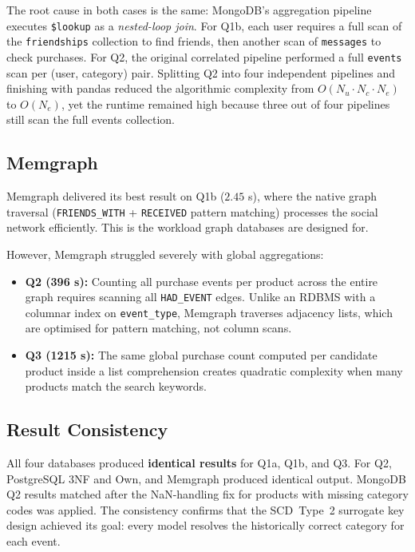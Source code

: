 \documentclass[12pt,a4paper]{article}
\begin{document}
The root cause in both cases is the same: MongoDB's aggregation pipeline
executes \texttt{\$lookup} as a \emph{nested-loop join}. For Q1b, each
user requires a full scan of the \texttt{friendships} collection to find
friends, then another scan of \texttt{messages} to check purchases. For Q2,
the original correlated pipeline performed a full \texttt{events} scan per
(user, category) pair. Splitting Q2 into four independent pipelines and
finishing with pandas reduced the algorithmic complexity from $O(N_u \cdot
N_c \cdot N_e)$ to $O(N_e)$, yet the runtime remained high because three
out of four pipelines still scan the full events collection.

\subsection{Memgraph}

Memgraph delivered its best result on Q1b ($2.45$ s), where the native graph
traversal (\texttt{FRIENDS\_WITH} + \texttt{RECEIVED} pattern matching)
processes the social network efficiently. This is the workload graph databases
are designed for.

However, Memgraph struggled severely with global aggregations:
\begin{itemize}
  \item \textbf{Q2 (396 s):} Counting all purchase events per product across
        the entire graph requires scanning all \texttt{HAD\_EVENT} edges.
        Unlike an RDBMS with a columnar index on \texttt{event\_type}, Memgraph
        traverses adjacency lists, which are optimised for pattern matching,
        not column scans.
  \item \textbf{Q3 (1215 s):} The same global purchase count computed per
        candidate product inside a list comprehension creates quadratic
        complexity when many products match the search keywords.
\end{itemize}

\subsection{Result Consistency}

All four databases produced \textbf{identical results} for Q1a, Q1b, and Q3.
For Q2, PostgreSQL 3NF and Own, and Memgraph produced identical output.
MongoDB Q2 results matched after the NaN-handling fix for products with
missing category codes was applied. The consistency confirms that the
SCD~Type~2 surrogate key design achieved its goal: every model resolves the
historically correct category for each event.
\end{document}
